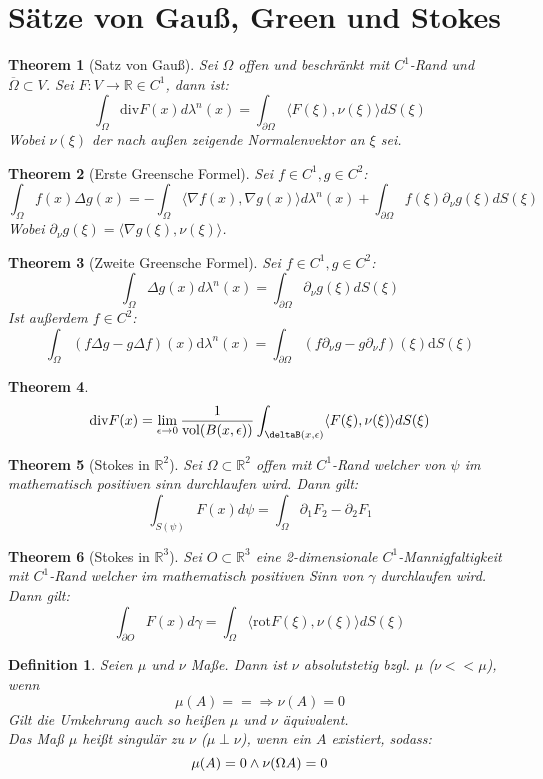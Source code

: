 \documentclass[10pt,a4paper]{article}
\newtheorem{theorem}{Theorem}
\newtheorem{definition}{Definition}
\begin{document}
\section{Sätze von Gauß, Green und Stokes}
\begin{theorem}[Satz von Gauß]
	Sei $\Omega$ offen und beschränkt mit $C^1$-Rand und $\overline{\Omega} \subset V$. Sei $F:V \to \mathbb{R}\in C^1$, dann ist:
	$$\int_\Omega \text{div} F(x)d\lambda^n(x) = \int_{\partial\Omega}\langle F(\xi), \nu(\xi)\rangle dS(\xi)$$
	Wobei $\nu(\xi)$ der nach außen zeigende Normalenvektor an $\xi$ sei.
\end{theorem}
\begin{theorem}[Erste Greensche Formel]
	Sei $f\in C^1, g\in C^2$:
	$$\int_{\Omega}f(x)\Delta g(x)= -\int_\Omega \langle\nabla f(x), \nabla g(x)\rangle d\lambda^n(x) + \int_{\partial\Omega}f(\xi)\partial_\nu g(\xi)dS(\xi)$$
	Wobei $\partial_\nu g(\xi) = \langle \nabla g(\xi), \nu(\xi)\rangle$.
\end{theorem}
\begin{theorem}[Zweite Greensche Formel]
	Sei $f\in C^1, g\in C^2$:
	$$\int_{\Omega}\Delta g(x) d\lambda^n(x) = \int_{\partial\Omega}\partial_\nu g(\xi)dS(\xi)$$
	Ist außerdem $f\in C^2$:
	$$\int_{\Omega}(f \Delta g-g \Delta f)(x) \mathrm{d} \lambda^n(x)=\int_{\partial \Omega}\left(f \partial_\nu g-g \partial_\nu f\right)(\xi) \mathrm{d} S(\xi)$$
\end{theorem}
\begin{theorem}
	$$\text{div} F(x) = \lim_{\epsilon \to 0}\frac{1}{\text{vol}(B(x, \epsilon))}\int_{\deltaB(x,\epsilon)} \langle F(\xi), \nu(\xi)\rangle dS(\xi)$$
\end{theorem}
\begin{theorem}[Stokes in $\mathbb{R}^2$]
	Sei $\Omega \subset \mathbb{R}^2$ offen mit $C^1$-Rand welcher von $\psi$ im mathematisch positiven sinn durchlaufen wird. Dann gilt:
	$$\int_{S(\psi)} F(x) d\psi = \int_\Omega \partial_1 F_2 -\partial_2F_1$$
\end{theorem}
\begin{theorem}[Stokes in $\mathbb{R}^3$]
	Sei $O \subset \mathbb{R}^3$  eine 2-dimensionale $C^1$-Mannigfaltigkeit mit $C^1$-Rand welcher im mathematisch positiven Sinn von $\gamma$ durchlaufen wird. Dann gilt:
	$$\int_{\partial O} F(x) d\gamma = \int_\Omega \langle \text{rot}F(\xi), \nu(\xi)\rangle dS(\xi)$$
\end{theorem}
\begin{definition}
	Seien $\mu$ und $\nu$ Maße. 
	Dann ist $\nu$ absolutstetig bzgl. $\mu$ ($\nu << \mu$), wenn $$\mu(A) = = \Rightarrow \nu(A)= 0$$
	Gilt die Umkehrung auch so heißen $\mu$ und $\nu$ äquivalent.\\
	Das Maß $\mu$ heißt singulär zu $\nu$ ($\mu \perp \nu$), wenn ein $A$ existiert, sodass:
	$$\mu(A) = 0 \land \nu(\Omega\\A) = 0$$
\end{definition}
\end{document}
